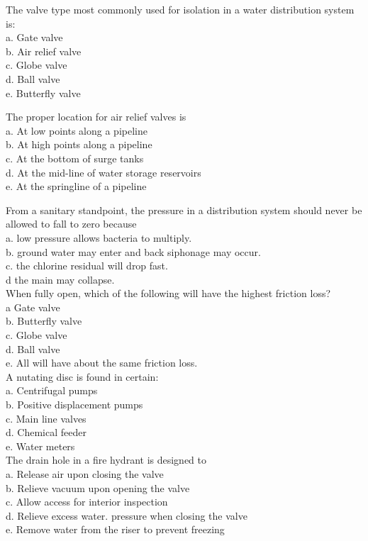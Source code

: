 The valve type most commonly used for isolation in a water distribution system is:\\
a.	Gate valve\\
b.	Air relief valve\\
c.	Globe valve\\
d.	Ball valve\\
e.	Butterfly valve

The proper location for air relief valves is\\
a.	At low points along a pipeline\\
b.	At high points along a pipeline\\
c.	At the bottom of surge tanks\\
d.	At the mid-line of water storage reservoirs\\
e.	At the springline of a pipeline

From a sanitary standpoint, the pressure in a distribution system should never be allowed to fall to zero because\\
a.	low pressure allows bacteria to multiply.\\
b.	ground water may enter and back siphonage may occur.\\
c.	the chlorine residual will drop fast.\\
d	the main may collapse.\\

When fully open, which of the following will have the highest friction loss?\\
a	Gate valve\\
b.	Butterfly valve\\
c.	Globe valve\\
d.	Ball valve\\
e.	All will have about the same friction loss.\\

A nutating disc is found in certain:\\
a.	Centrifugal pumps\\
b.	Positive displacement pumps\\
c.	Main line valves\\
d.	Chemical feeder\\
e.	Water meters\\

The drain hole in a fire hydrant is designed to\\
a.	Release air upon closing the valve\\
b.	Relieve vacuum upon opening the valve\\
c.	Allow access for interior inspection\\
d.	Relieve excess water. pressure when closing the valve\\
e.	Remove water from the riser to prevent freezing\\

